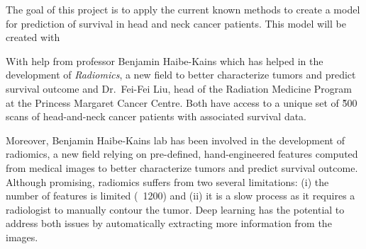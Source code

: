 \documentclass[a4paper]{article}
\begin{document}
The goal of this project is to apply the current known methods to create a model for prediction
of survival in head and neck cancer patients. This model will be created with 

With help from professor Benjamin Haibe-Kains which has helped in the development of 
\emph{Radiomics}, a new field to better characterize tumors and predict survival outcome and 
Dr.~Fei-Fei Liu, head of the Radiation Medicine Program at the Princess Margaret Cancer Centre. 
Both have access to a unique set of \~500 scans of head-and-neck cancer patients with associated 
survival data. 

Moreover, Benjamin Haibe-Kains lab has been involved in the development of radiomics, a new field 
relying on pre-defined, hand-engineered features computed from medical images to better characterize 
tumors and predict survival outcome. Although promising, radiomics suffers from two several 
limitations: (i) the number of features is limited (~1200) and (ii) it is a slow process as it 
requires a radiologist to manually contour the tumor. Deep learning has the potential to
address both issues by automatically extracting more information from the images.
~\cite{deep-learning-radiomics-gbm}
\end{document}
